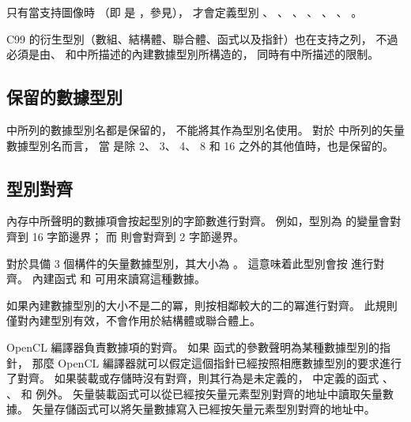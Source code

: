 只有當支持圖像時
（即  是 ，參見），
才會定義型別 、 、 、
 、 、 、
 。

C99 的衍生型別（數組、結構體、聯合體、函式以及指針）也在支持之列，
不過必須是由、
和中所描述的內建數據型別所構造的，
同時有中所描述的限制。

\subsection{保留的數據型別}

 中所列的數據型別名都是保留的，
不能將其作為型別名使用。
對於 中所列的矢量數據型別名而言，
當  是除 2、 3、 4、 8 和 16 之外的其他值時，也是保留的。


\subsection{型別對齊}

內存中所聲明的數據項會按起型別的字節數進行對齊。
例如，型別為  的變量會對齊到 16 字節邊界；
而  則會對齊到 2 字節邊界。

對於具備 3 個構件的矢量數據型別，其大小為 。
這意味着此型別會按  進行對齊。
內建函式  和  可用來讀寫這種數據。

如果內建數據型別的大小不是二的冪，則按相鄰較大的二的冪進行對齊。
此規則僅對內建型別有效，不會作用於結構體或聯合體上。

OpenCL 編譯器負責數據項的對齊。
如果  函式的參數聲明為某種數據型別的指針，
那麼 OpenCL 編譯器就可以假定這個指針已經按照相應數據型別的要求進行了對齊。
如果裝載或存儲時沒有對齊，則其行為是未定義的，
中定義的函式 、 、
  和  例外。
矢量裝載函式可以從已經按矢量元素型別對齊的地址中讀取矢量數據。
矢量存儲函式可以將矢量數據寫入已經按矢量元素型別對齊的地址中。

